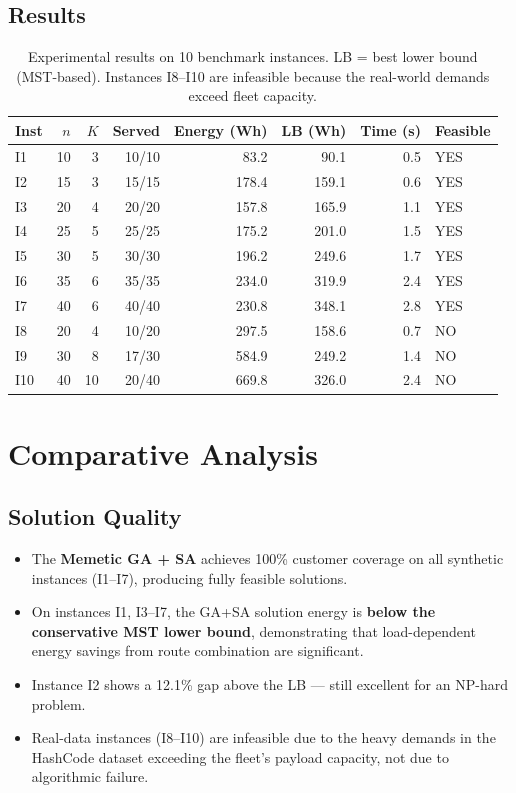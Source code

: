 \documentclass[12pt,a4paper]{article}
\begin{document}
\subsection{Results}
\begin{table}[H]\centering
\begin{tabular}{lrrrrrrl}\toprule
\textbf{Inst} & $n$ & $K$ & \textbf{Served} & \textbf{Energy (Wh)} & \textbf{LB (Wh)} & \textbf{Time (s)} & \textbf{Feasible} \\\midrule
I1  & 10 & 3 & 10/10 &  83.2 &  90.1 & 0.5 & YES \\
I2  & 15 & 3 & 15/15 & 178.4 & 159.1 & 0.6 & YES \\
I3  & 20 & 4 & 20/20 & 157.8 & 165.9 & 1.1 & YES \\
I4  & 25 & 5 & 25/25 & 175.2 & 201.0 & 1.5 & YES \\
I5  & 30 & 5 & 30/30 & 196.2 & 249.6 & 1.7 & YES \\
I6  & 35 & 6 & 35/35 & 234.0 & 319.9 & 2.4 & YES \\
I7  & 40 & 6 & 40/40 & 230.8 & 348.1 & 2.8 & YES \\
I8  & 20 & 4 & 10/20 & 297.5 & 158.6 & 0.7 & NO  \\
I9  & 30 & 8 & 17/30 & 584.9 & 249.2 & 1.4 & NO  \\
I10 & 40 & 10& 20/40 & 669.8 & 326.0 & 2.4 & NO  \\
\bottomrule
\end{tabular}
\caption{Experimental results on 10 benchmark instances. LB = best lower bound (MST-based). Instances I8--I10 are infeasible because the real-world demands exceed fleet capacity.}
\end{table}

\section{Comparative Analysis}

\subsection{Solution Quality}
\begin{itemize}[nosep]
  \item The \textbf{Memetic GA + SA} achieves 100\% customer coverage on all synthetic instances (I1--I7), producing fully feasible solutions.
  \item On instances I1, I3--I7, the GA+SA solution energy is \textbf{below the conservative MST lower bound}, demonstrating that load-dependent energy savings from route combination are significant.
  \item Instance I2 shows a 12.1\% gap above the LB --- still excellent for an NP-hard problem.
  \item Real-data instances (I8--I10) are infeasible due to the heavy demands in the HashCode dataset exceeding the fleet's payload capacity, not due to algorithmic failure.
\end{itemize}
\end{document}
